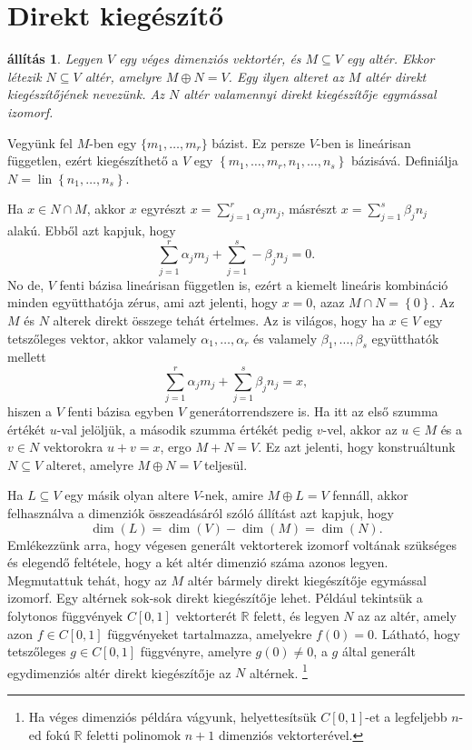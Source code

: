 \documentclass[a4paper, showtrims]{memoir}
\makeatletter
\renewenvironment{proof}[1][\proofname]
    {\par\pushQED{\qed}%
    \normalfont \topsep6\p@\@plus6\p@\relax
    \trivlist
    \item[\hskip\labelsep
        \itshape
    #1\@addpunct{:}]\ignorespaces}
    {\popQED\endtrivlist\@endpefalse}
\theoremstyle{plain}
\newtheorem{proposition}{állítás}[chapter]
\theoremstyle{remark}
\theoremstyle{definition}
\DeclareMathOperator{\lin}{lin}
\makeatother
\begin{document}
\section{Direkt kiegészítő}
\begin{proposition}
	Legyen $V$ egy véges dimenziós vektortér, és $M\subseteq V$ egy altér.
	Ekkor létezik $N\subseteq V$ altér,
	amelyre $M\oplus N=V$.
	Egy ilyen alteret az $M$ altér \emph{direkt kiegészítőjének} nevezünk.
	Az $N$ altér valamennyi direkt kiegészítője egymással izomorf.
\end{proposition}
\begin{proof}
    Vegyünk fel $M$-ben egy $\{m_1,\ldots,m_r\}$ bázist.
    Ez persze $V$-ben is lineárisan független, 
    ezért kiegészíthető a $V$ egy $\left\{ m_1,\ldots,m_r,n_1,\ldots,n_s \right\}$ bázisává.
    Definiálja $N=\lin\left\{ n_1,\ldots,n_s \right\}$.
    
    Ha $x\in N\cap M$, akkor $x$ egyrészt $x=\sum_{j=1}^r\alpha_jm_j$, 
    másrészt $x=\sum_{j=1}^s\beta_jn_j$ alakú.
    Ebből azt kapjuk, hogy
    \[
        \sum_{j=1}^r\alpha_jm_j+\sum_{j=1}^s-\beta_jn_j=0.
    \]
    No de, $V$ fenti bázisa lineárisan független is,
    ezért a kiemelt lineáris kombináció minden együtthatója zérus, ami azt jelenti, hogy $x=0$,
    azaz $M\cap N=\left\{ 0 \right\}$.
    Az $M$ és $N$ alterek direkt összege tehát értelmes.
    Az is világos, hogy ha $x\in V$ egy tetszőleges vektor, akkor valamely $\alpha_1,\ldots,\alpha_r$ és valamely $\beta_1,\ldots,\beta_s$ együtthatók mellett
    \[
        \sum_{j=1}^r\alpha_jm_j+\sum_{j=1}^s\beta_jn_j=x,
    \]
    hiszen a $V$ fenti bázisa egyben $V$ generátorrendszere is.
    Ha itt az első szumma értékét $u$-val jelöljük, a második szumma értékét pedig $v$-vel,
    akkor az $u\in M$ és a $v\in N$ vektorokra $u+v=x$,
    ergo $M+N=V$.
    Ez azt jelenti, hogy konstruáltunk $N\subseteq V$ alteret, amelyre $M\oplus N=V$ teljesül.

    Ha $L\subseteq V$ egy másik olyan altere $V$-nek, amire $M\oplus L=V$ fennáll,
    akkor felhasználva a dimenziók összeadásáról szóló állítást azt kapjuk, hogy
    \[
        \dim(L)=\dim(V)-\dim(M)=\dim(N).
    \]
    Emlékezzünk arra, hogy végesen generált vektorterek izomorf voltának szükséges és elegendő feltétele, hogy a két altér dimenzió száma  azonos legyen.
    Megmutattuk tehát, hogy az $M$ altér bármely direkt kiegészítője egymással izomorf.
\end{proof}
Egy altérnek sok-sok direkt kiegészítője lehet.
Például tekintsük a folytonos függvények $C\left[ 0,1 \right]$ vektorterét $\mathbb{R}$ felett,
és legyen $N$ az az altér, amely azon $f\in C\left[ 0,1 \right]$ függvényeket tartalmazza,
amelyekre $f\left( 0 \right)=0$.
Látható, hogy tetszőleges $g\in C\left[ 0,1 \right]$ függvényre, amelyre $g\left( 0 \right)\neq 0$,
a $g$ által generált egydimenziós altér direkt kiegészítője az $N$ altérnek.%
\footnote{
	Ha véges dimenziós példára vágyunk,
	helyettesítsük $C\left[ 0,1 \right]$-et a legfeljebb $n$-ed fokú
	$\mathbb{R}$ feletti polinomok $n+1$ dimenziós vektorterével.
}
\end{document}
